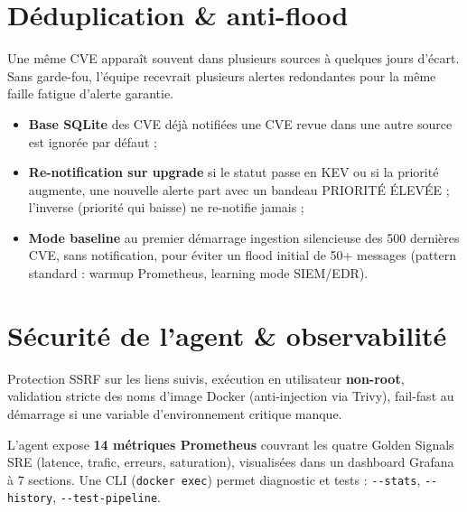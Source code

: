 \documentclass[11pt,a4paper]{article}
\begin{document}
\section{Déduplication \& anti-flood}

Une même CVE apparaît souvent dans plusieurs sources à quelques jours d'écart. Sans garde-fou, l'équipe recevrait plusieurs alertes redondantes pour la même faille \textemdash{} fatigue d'alerte garantie.

\begin{itemize}
  \item \textbf{Base SQLite} des CVE déjà notifiées \textemdash{} une CVE revue dans une autre source est ignorée par défaut ;
  \item \textbf{Re-notification sur upgrade} \textemdash{} si le statut passe en KEV ou si la priorité augmente, une nouvelle alerte part avec un bandeau \og PRIORITÉ ÉLEVÉE \fg{} ; l'inverse (priorité qui baisse) ne re-notifie jamais ;
  \item \textbf{Mode baseline} au premier démarrage \textemdash{} ingestion silencieuse des 500 dernières CVE, sans notification, pour éviter un flood initial de 50+ messages (pattern standard : warmup Prometheus, learning mode SIEM/EDR).
\end{itemize}

\section{Sécurité de l'agent \& observabilité}

\begin{resultbox}[title={\faLock~Un outil de sécurité doit être sécurisé lui-même}]
Protection SSRF sur les liens suivis, exécution en utilisateur \textbf{non-root}, validation stricte des noms d'image Docker (anti-injection via Trivy), fail-fast au démarrage si une variable d'environnement critique manque.
\end{resultbox}

L'agent expose \textbf{14 métriques Prometheus} couvrant les quatre Golden Signals SRE (latence, trafic, erreurs, saturation), visualisées dans un dashboard Grafana à 7 sections. Une CLI (\texttt{docker exec}) permet diagnostic et tests : \texttt{-{}-stats}, \texttt{-{}-history}, \texttt{-{}-test-pipeline}.

\end{document}
